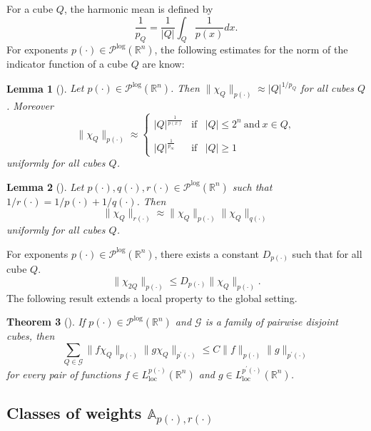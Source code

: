 \documentclass[a4paper,11pt,reqno]{amsart}
\theoremstyle{plain}
\numberwithin{equation}{section}
\newtheorem{teo}{Theorem}[section]
\newtheorem{lema}[teo]{Lemma}
\theoremstyle{definition}
\newcommand{\R}{{\mathbb{R}^n}}
\begin{document}
	For a cube $Q$, the harmonic mean is defined by
	$$\frac{1}{p_Q}=\frac{1}{|Q|}\int_{Q}\frac{1}{p(x)}dx.$$ 
	For exponents $p(\cdot)\in\mathcal{P}^{\text{log}}(\R)$, the following estimates for the norm of the indicator function of a cube $Q$ are know:
	\begin{lema}[\cite{libro Diening}]\label{norma de cubos comparada con |Q|}
	 	Let $p(\cdot)\in \mathcal{P}^{\text{log}}(\R)$. Then $\|\chi_Q\|_{p(\cdot)}\approx|Q|^{1/p_Q}$ for all cubes $Q$. Moreover
	 	\begin{equation*}
	 		\|\chi_Q\|_{p(\cdot)}\approx \left\{ \begin{array}{lcc} |Q|^{\frac{1}{p(x)}} & \text{if} & |Q|\leq 2^n \ \text{and} \ x\in Q,\\ \\ |Q|^{\frac{1}{p_\infty}} & \text{if} & |Q|\geq 1 \end{array} \right.
	 	\end{equation*}
	 	uniformly for all cubes $Q$.
	\end{lema}
	\begin{lema}[\cite{libro Diening}]\label{norma de cubos}
		Let $p(\cdot),q(\cdot),r(\cdot)\in \mathcal{P}^{\text{log}}(\R)$ such that $1/r(\cdot)=1/p(\cdot)+1/q(\cdot)$. Then 
		$$\|\chi_Q\|_{r(\cdot)}\approx\|\chi_Q\|_{p(\cdot)}\|\chi_Q\|_{q(\cdot)}$$
		uniformly for all cubes $Q$.
	\end{lema}
	For exponents $p(\cdot)\in\mathcal{P}^{\text{log}}(\R)$, there exists a constant $D_{p(\cdot)}$ such that for all cube $Q$.
		\begin{equation}\label{doblante}
			\|\chi_{2Q}\|_{p(\cdot)}\leq D_{{p(\cdot)}}\|\chi_Q\|_{p(\cdot)}.
		\end{equation}
	The following result extends a local property to the global setting.
	\begin{teo}[\cite{C-U Diening Hasto}]\label{teo suma de normas}
		If $p(\cdot)\in\mathcal{P}^{\text{log}}(\R)$ and $\mathcal{G}$ is a family of pairwise disjoint cubes, then 
		\begin{equation*}
			\sum_{Q\in\mathcal{G}}\|f\chi_Q\|_{p(\cdot)} \|g\chi_Q\|_{p^\prime(\cdot)}\leq C \|f\|_{p(\cdot)}\|g\|_{p^\prime(\cdot)}
		\end{equation*}
		for every pair of functions $f\in L^{p(\cdot)}_{\text{loc}}(\R)$ and $g\in L^{p^\prime(\cdot)}_{\text{loc}}(\R)$.
	\end{teo}



\subsection{Classes of weights $\mathbb{A}_{p(\cdot),r(\cdot)}$}
\
\end{document}
